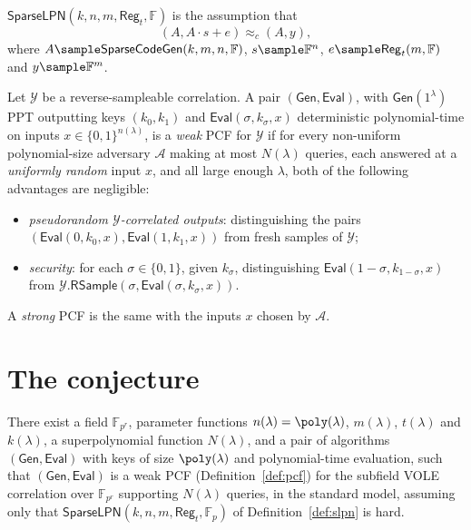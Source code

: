 \documentclass{conjura-conjecture}
\newcommand{\Adv}{\mathcal{A}}
\newcommand{\Corr}{\mathcal{Y}}
\newcommand{\F}{\mathbb{F}}
\newcommand{\Gen}{\mathsf{Gen}}
\newcommand{\Eval}{\mathsf{Eval}}
\newcommand{\SparseLPN}{\mathsf{SparseLPN}}
\newcommand{\SparseCodeGen}{\mathsf{SparseCodeGen}}
\newcommand{\Reg}{\mathsf{Reg}}
\newcommand{\bits}{\{0,1\}}
\begin{document}
\begin{definition}\label{def:slpn}
$\SparseLPN(k, n, m, \Reg_{t}, \F)$ is the assumption that
\[
  (A, A \cdot s + e) \approx_{c} (A, y),
\]
where $A \sample \SparseCodeGen(k, m, n, \F)$, $s \sample \F^{n}$,
$e \sample \Reg_{t}(m, \F)$ and $y \sample \F^{m}$.
\end{definition}

\begin{definition}\label{def:pcf}
Let $\Corr$ be a reverse-sampleable correlation. A pair $(\Gen, \Eval)$,
with $\Gen(1^{\lambda})$ PPT outputting keys $(k_{0}, k_{1})$ and
$\Eval(\sigma, k_{\sigma}, x)$ deterministic polynomial-time on inputs
$x \in \bits^{n(\lambda)}$, is a \emph{weak} PCF for $\Corr$ if for
every non-uniform polynomial-size adversary $\Adv$ making at most
$N(\lambda)$ queries, each answered at a \emph{uniformly random} input
$x$, and all large enough $\lambda$, both of the following advantages
are negligible:
\begin{itemize}[nosep]
  \item \emph{pseudorandom $\Corr$-correlated outputs}: distinguishing
    the pairs $(\Eval(0, k_{0}, x), \Eval(1, k_{1}, x))$ from fresh
    samples of $\Corr$;
  \item \emph{security}: for each $\sigma \in \bits$, given
    $k_{\sigma}$, distinguishing $\Eval(1-\sigma, k_{1-\sigma}, x)$ from
    $\Corr.\mathsf{RSample}(\sigma, \Eval(\sigma, k_{\sigma}, x))$.
\end{itemize}
A \emph{strong} PCF is the same with the inputs $x$ chosen by $\Adv$.
\end{definition}

\section{The conjecture}\label{sec:conjectures}

\begin{conjecture}\label{conj:main}
There exist a field $\F_{p^{r}}$, parameter functions
$n(\lambda) = \poly(\lambda)$, $m(\lambda)$, $t(\lambda)$ and
$k(\lambda)$, a superpolynomial function $N(\lambda)$, and a pair of
algorithms $(\Gen, \Eval)$ with keys of size $\poly(\lambda)$ and
polynomial-time evaluation, such that $(\Gen, \Eval)$ is a weak PCF
(Definition~\ref{def:pcf}) for the subfield VOLE correlation over
$\F_{p^{r}}$ supporting $N(\lambda)$ queries, in the standard model,
assuming only that $\SparseLPN(k, n, m, \Reg_{t}, \F_{p})$ of
Definition~\ref{def:slpn} is hard.
\end{conjecture}
\end{document}
